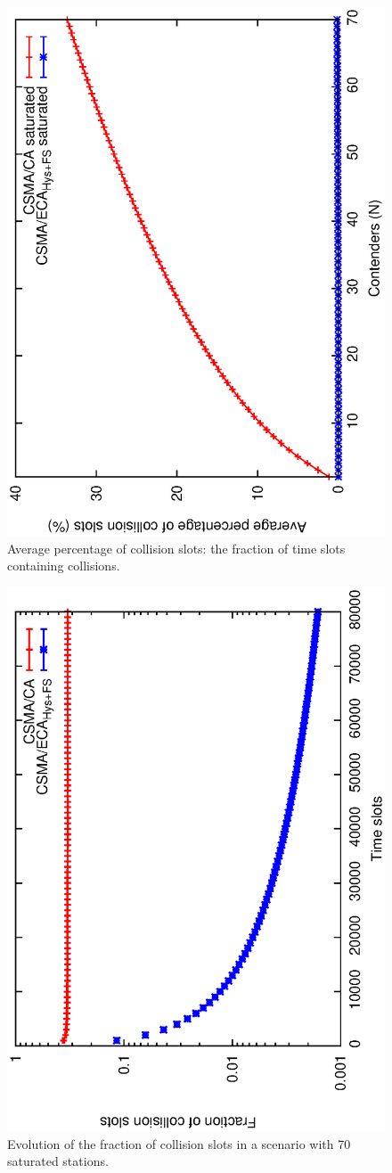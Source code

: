 \documentclass[a4paper,journal]{IEEEtran}
\begin{document}
	\begin{figure}[tb]
	\centering
		\includegraphics[width=0.7\linewidth,angle=-90]{figures/saturated/collisions-saturated/collisions-saturated.eps}
		\caption{Average percentage of collision slots: the fraction of time slots containing collisions.}
		\label{fig:collisions-sat}
	\end{figure}
	
	\begin{figure}[tb]
	\centering
		\includegraphics[width=0.7\linewidth,angle=-90]{figures/saturated/slots/Pc-evolution.eps}
		\caption{Evolution of the fraction of collision slots in a scenario with 70 saturated stations.}
		\label{fig:collisions-evolution}
	\end{figure}
	
\end{document}
